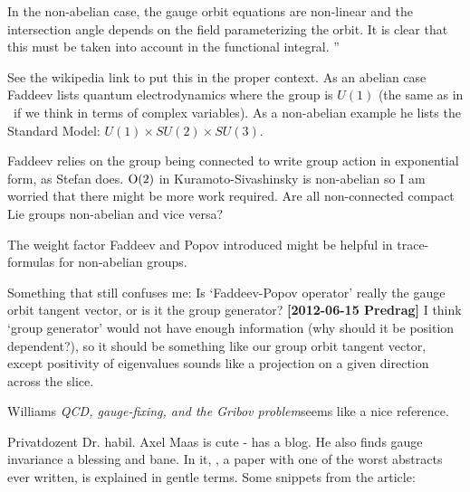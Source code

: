 \begin{description}
In the non-abelian case, the gauge orbit equations are non-linear and the
intersection angle depends on the field parameterizing the orbit. It is
clear that this must be taken into account in the functional integral.
'' %

See the wikipedia link to put this in the proper context. As an abelian
case Faddeev lists quantum electrodynamics where the group is $U(1)$ (the
same as in \cLe\ if we think in terms of complex variables). As a
non-abelian example he lists the Standard Model: $U(1)\times SU(2) \times
SU(3)$.

Faddeev relies on the group being connected to write group action in
exponential form, as Stefan does. $\textrm{O}(2)$ in Kuramoto-Sivashinsky is
non-abelian so I am worried that there might be more work required. Are
all non-connected compact Lie groups non-abelian and vice versa?

The weight factor Faddeev and Popov introduced might be helpful in
trace-formulas for non-abelian groups.

\item[2012-06-15 Evangelos]
Something that still confuses me: Is `Faddeev-Popov operator' really the
gauge orbit tangent vector, or is it the group generator? {\bf
[2012-06-15 Predrag]} I think `group generator' would not have enough
information (why should it be position dependent?), so it should be
something like our group orbit tangent vector, except positivity of
eigenvalues sounds like a projection on a given direction across the
slice.

\item[2013-11-27  Predrag]
Williams {\em {QCD}, gauge-fixing, and the {Gribov}
problem}seems like a nice reference.

 	Privatdozent Dr. habil.
  {Axel Maas} is cute - has a blog.
He also finds gauge invariance a 
{blessing and bane}.
In it, , a paper with one of the worst abstracts
ever written, is explained in gentle terms. Some snippets from the article:


\end{description}
